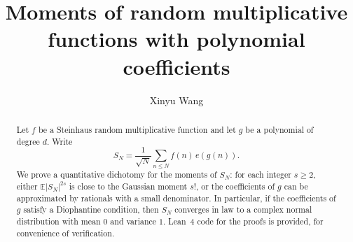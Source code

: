 




\title{Moments of random multiplicative functions with polynomial coefficients}
\author{Xinyu Wang}
\maketitle

\begin{abstract}
Let \(f\) be a Steinhaus random multiplicative function and let \(g\) be a polynomial of degree \(d\). Write
\[
S_N=\frac1{\sqrt N}\sum_{n\le N}f(n)\,e(g(n)).
\]
We prove a quantitative dichotomy for the moments of \(S_N\): for each integer \(s\ge 2\), either \(\mathbb{E}|S_N|^{2s}\) is close to the Gaussian moment \(s!\), or the coefficients of \(g\) can be approximated by rationals with a small denominator. In particular, if the coefficients of \(g\) satisfy a Diophantine condition, then \(S_N\) converges in law to a complex normal distribution with mean \(0\) and variance \(1\). Lean~4 code for the proofs is provided, for convenience of verification.
\end{abstract}








